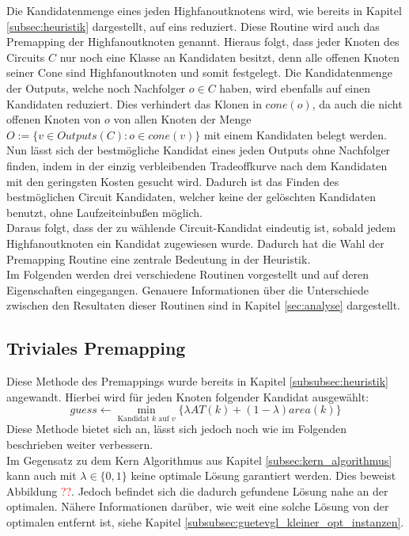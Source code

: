 \documentclass[11pt, a4paper, german]{article}
\begin{document}
 Die Kandidatenmenge eines jeden Highfanoutknotens wird, wie bereits in Kapitel \ref{subsec:heuristik} dargestellt, auf eins reduziert. Diese Routine wird auch das Premapping der Highfanoutknoten genannt. Hieraus folgt, dass jeder Knoten des Circuits $C$ nur noch eine Klasse an Kandidaten besitzt, denn alle offenen Knoten seiner Cone sind Highfanoutknoten und somit festgelegt.  Die Kandidatenmenge der Outputs, welche noch Nachfolger $o \in C$ haben, wird ebenfalls auf einen Kandidaten reduziert. Dies verhindert das Klonen in $cone(o)$, da  auch die nicht offenen Knoten von $o$ von allen Knoten der Menge $O := \{ v \in Outputs(C): o \in cone(v) \}$ mit einem Kandidaten belegt werden.\\
Nun lässt sich der bestmögliche Kandidat eines jeden Outputs ohne Nachfolger finden, indem in der einzig verbleibenden Tradeoffkurve nach dem Kandidaten mit den geringsten Kosten gesucht wird. Dadurch ist das Finden des  bestmöglichen Circuit Kandidaten,  welcher keine der gelöschten Kandidaten benutzt, ohne Laufzeiteinbußen möglich. \\
Daraus folgt, dass der zu wählende Circuit-Kandidat eindeutig ist, sobald jedem Highfanoutknoten ein Kandidat zugewiesen wurde. Dadurch hat die Wahl der Premapping Routine eine zentrale Bedeutung in der Heuristik.\\
Im Folgenden werden drei verschiedene Routinen vorgestellt und auf deren Eigenschaften eingegangen. Genauere Informationen über die Unterschiede zwischen den Resultaten dieser Routinen sind in Kapitel \ref{sec:analyse} dargestellt.

\subsection{Triviales Premapping}
\label{subsec:triviales_premapping}
Diese Methode des Premappings wurde bereits in Kapitel \ref{subsubsec:heuristik} angewandt. Hierbei wird für jeden Knoten folgender Kandidat ausgewählt: \[ guess \gets \min\limits_{\text{Kandidat }k\text{ auf }v}\{ \lambda AT(k) + (1-\lambda) area(k)  \} \]
Diese Methode bietet sich an, lässt sich jedoch noch wie im Folgenden beschrieben weiter verbessern. \\

Im Gegensatz zu dem Kern Algorithmus aus Kapitel \ref{subsec:kern_algorithmus} kann auch mit $\lambda \in \{ 0 , 1\}$ keine optimale Lösung garantiert werden. Dies beweist Abbildung \textcolor{red}{??}. Jedoch befindet sich die dadurch gefundene Lösung nahe an der optimalen. Nähere Informationen darüber, wie weit eine solche Lösung von der optimalen entfernt ist, siehe Kapitel \ref{subsubsec:guetevgl_kleiner_opt_instanzen}.\\ 
 
\end{document}
